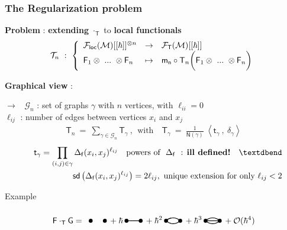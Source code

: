 \documentclass[9pt]{beamer}
\newcommand{\sm}[1]{\left\langle #1 \right\rangle}
\newcommand{\loc}{\mathsf{loc}}
\newcommand{\sd}{\mathsf{sd}}
\newcommand{\Fcal}{\mathcal{F}}
\newcommand{\Gcal}{\mathcal{G}}
\newcommand{\Mcal}{\mathcal{M}}
\newcommand{\Ocal}{\mathcal{O}}
\newcommand{\Tcal}{\mathcal{T}}
\newcommand{\Fsf}{\mathsf{F}}
\newcommand{\Gsf}{\mathsf{G}}
\newcommand{\Nsf}{\mathsf{N}}
\newcommand{\Tsf}{\mathsf{T}}
\newcommand{\fsf}{\mathsf{f}}
\newcommand{\msf}{\mathsf{m}}
\newcommand{\nsf}{\mathsf{n}}
\newcommand{\tsf}{\mathsf{t}}
\newcommand{\FG}{\begin{tikzpicture}[thick,scale=1.5]
\useasboundingbox (-0.1,-0.07) rectangle (0.5,0.4);
\filldraw (0,0) circle (1.3pt);
\filldraw (0.4,0) circle (1.3pt);
\end{tikzpicture} }
\newcommand{\FoneG}{\begin{tikzpicture}[thick,scale=1.5]
\useasboundingbox (-0.1,-0.07) rectangle (0.5,0.4);
\filldraw (0,0) circle (1.3pt);
\filldraw (0.4,0) circle (1.3pt);
\draw (0,0) -- (0.4,0);
\end{tikzpicture} }
\newcommand{\FtwoG}{\begin{tikzpicture}[thick,scale=1.5]
\useasboundingbox (-0.1,-0.07) rectangle (0.5,0.4);
\filldraw (0,0) circle (1.3pt);
\filldraw (0.4,0) circle (1.3pt);
\draw (0,0) edge [out=45,in=135] node[above] {} (0.4,0);
\draw (0,0) edge [out=-45,in=-135] node[above] {} (0.4,0);
\end{tikzpicture} }
\newcommand{\FthreeG}{\begin{tikzpicture}[thick,scale=1.5]
\useasboundingbox (-0.1,-0.07) rectangle (0.5,0.4);
\filldraw (0,0) circle (1.3pt);
\filldraw (0.4,0) circle (1.3pt);
\draw (0,0) edge [out=45,in=135] node[above] {} (0.4,0);
\draw (0,0) -- (0.4,0);
\draw (0,0) edge [out=-45,in=-135] node[above] {} (0.4,0);
\end{tikzpicture} }
\begin{document}

\begin{frame}[label=graph]

\frametitle{The Regularization problem}

\vfill

\textbf{Problem} : \textbf{extending} $\cdot_\Tsf$ to \textbf{local functionals}
%
\vspace*{-7pt}
\begin{equation*}
\Tcal_n \ : \ 
\left\{
\begin{array}{lcl}
\Fcal_\loc(\Mcal)[[\hbar]]^{\otimes n} & \to & \Fcal_\Tsf(\Mcal)[[\hbar]] \\
\Fsf_1 \otimes \ ... \ \otimes \Fsf_n & \mapsto & \msf_\nsf \circ \Tsf_n \bigg( \Fsf_1 \otimes \ ... \ \otimes \Fsf_n \bigg)
\end{array}
\right. 
\vspace*{-7pt}
\end{equation*}

\vfill

\textbf{Graphical view} :

$\to$ \ $\Gcal_n$ : set of graphs $\gamma$ with $n$ vertices, with $\ell_{ii}=0$ \\
\hspace*{13pt} $\ell_{ij}$ : number of edges between vertices $x_i$ and $x_j$ \hfill \hyperlink{details_graph}{}
%
\begin{eqnarray*}
\Tsf_n \ = \ \sum_{\gamma \in \Gcal_n} \Tsf_\gamma \ , \ \ \mbox{with} \quad \Tsf_\gamma \ = \ \frac{1}{\Nsf(\gamma)} \ \sm{\tsf_\gamma \ , \ \delta_\gamma}
\end{eqnarray*}
%
\vspace*{-10pt}
%
\begin{eqnarray*}
&& \tsf_\gamma = \prod_{(i,j)\in\gamma} \Delta_\fsf(x_i,x_j)^{\ell_{ij}}
\quad \mbox{powers of } \ \Delta_\fsf \ \mbox{ : \textbf{ill defined!}} \quad \textdbend \\
&& \sd\left(\Delta_\fsf(x_i,x_j)^{\ell_{ij}}\right) = 2 \ell_{ij} , \ \mbox{unique extension for only } \ell_{ij} < 2 
\end{eqnarray*}

\vspace*{-2pt}
\vfill

\begin{exampleblock}{Example}
\vspace*{-29pt}
\begin{equation*}
\Fsf \cdot_{\Tsf} \Gsf  = \ \FG + \hbar \FoneG + \hbar^2 \FtwoG + \hbar^3 \FthreeG + \Ocal(\hbar^4)
\vspace*{-6pt}
\end{equation*}
\end{exampleblock}

\vfill

\end{frame}
\end{document}
